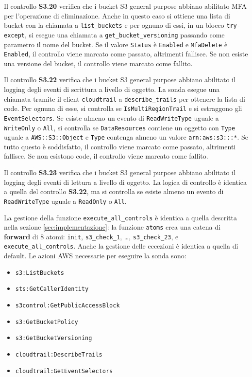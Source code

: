 Il controllo \textbf{S3.20} verifica che i bucket S3 general purpose abbiano abilitato MFA per l'operazione di eliminazione. Anche in questo caso si ottiene una lista di bucket con la chiamata a \texttt{list\_buckets} e per ognuno di essi, in un blocco \texttt{try-except}, si esegue una chiamata a \texttt{get\_bucket\_versioning} passando come parametro il nome del bucket. Se il valore \texttt{Status} è \texttt{Enabled} e \texttt{MfaDelete} è \texttt{Enabled}, il controllo viene marcato come passato, altrimenti fallisce. Se non esiste una versione del bucket, il controllo viene marcato come fallito.

Il controllo \textbf{S3.22} verifica che i bucket S3 general purpose abbiano abilitato il logging degli eventi di scrittura a livello di oggetto. La sonda esegue una chiamata tramite il client \texttt{cloudtrail} a \texttt{describe\_trails} per ottenere la lista di code. Per ognuna di esse, si controlla se \texttt{IsMultiRegionTrail} e si estraggono gli \texttt{EventSelectors}. Se esiste almeno un evento di \texttt{ReadWriteType} uguale a \texttt{WriteOnly} o \texttt{All}, si controlla se \texttt{DataResources} contiene un oggetto con \texttt{Type} uguale a \texttt{AWS::S3::Object} e \texttt{Type} contenga almeno un  valore \texttt{arn:aws:s3:::*}. Se tutto questo è soddisfatto, il controllo viene marcato come passato, altrimenti fallisce. Se non esistono code, il controllo viene marcato come fallito.

Il controllo \textbf{S3.23} verifica che i bucket S3 general purpose abbiano abilitato il logging degli eventi di lettura a livello di oggetto. La logica di controllo è identica a quella del controllo \textbf{S3.22}, ma si controlla se esiste almeno un evento di \texttt{ReadWriteType} uguale a \texttt{ReadOnly} o \texttt{All}. 

La gestione della funzione \texttt{execute\_all\_controls} è identica a quella descritta nella sezione \ref{sec:implementazione}: la funzione \texttt{atoms} crea una catena di \textbf{forward} di 8 atomi: \texttt{init}, \texttt{s3\_check\_1}, \dots, \texttt{s3\_check\_23}, e \texttt{execute\_all\_controls}. Anche la gestione delle eccezioni è identica a quella di default.
Le azioni AWS necessarie per eseguire la sonda sono:
\begin{itemize}
    \item \texttt{s3:ListBuckets}
    \item \texttt{sts:GetCallerIdentity}
    \item \texttt{s3control:GetPublicAccessBlock}
    \item \texttt{s3:GetBucketPolicy}
    \item \texttt{s3:GetBucketVersioning}
    \item \texttt{cloudtrail:DescribeTrails}
    \item \texttt{cloudtrail:GetEventSelectors}
\end{itemize}

